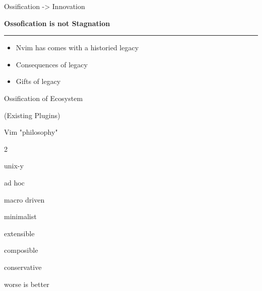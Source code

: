 \documentclass{beamer}
\begin{document}
\begin{frame}{Ossification -> Innovation}

	\textbf{Ossofication is not Stagnation}

	\rule{\textwidth}{0.1em}

	\begin{itemize}

		\item Nvim has comes with a historied legacy

		\item Consequences of legacy

		\item Gifts of legacy

	\end{itemize}

\end{frame}


\begin{frame}[standout]

	Ossification of Ecosystem

	(Existing Plugins)

\end{frame}


\begin{frame}{Vim "philosophy"}

	\begin{itemize}


	\end{itemize}

\end{frame}
\end{document}

